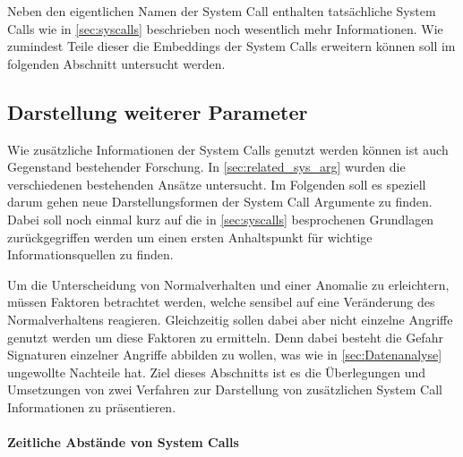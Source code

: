                 Neben den eigentlichen Namen der System Call enthalten tatsächliche System Calls wie in \autoref{sec:syscalls} beschrieben noch wesentlich mehr Informationen.
                Wie zumindest Teile dieser die Embeddings der System Calls erweitern können soll im folgenden Abschnitt untersucht werden.

        \subsection{Darstellung weiterer Parameter}\label{sec:Meta}
                Wie zusätzliche Informationen der System Calls genutzt werden können ist auch Gegenstand bestehender Forschung.
                In \autoref{sec:related_sys_arg} wurden die verschiedenen bestehenden Ansätze untersucht.
                Im Folgenden soll es speziell darum gehen neue Darstellungsformen der System Call Argumente zu finden.
                Dabei soll noch einmal kurz auf die in \autoref{sec:syscalls} besprochenen Grundlagen zurückgegriffen werden um einen ersten Anhaltspunkt für wichtige Informationsquellen zu finden.

                Um die Unterscheidung von Normalverhalten und einer Anomalie zu erleichtern, müssen Faktoren betrachtet werden, welche sensibel auf eine Veränderung des Normalverhaltens reagieren.
                Gleichzeitig sollen dabei aber nicht einzelne Angriffe genutzt werden um diese Faktoren zu ermitteln.
                Denn dabei besteht die Gefahr Signaturen einzelner Angriffe abbilden zu wollen, was wie in \autoref{sec:Datenanalyse} ungewollte Nachteile hat.
                Ziel dieses Abschnitts ist es die Überlegungen und Umsetzungen von zwei Verfahren zur Darstellung von zusätzlichen System Call Informationen zu präsentieren.

                \paragraph{Zeitliche Abstände von System Calls}

